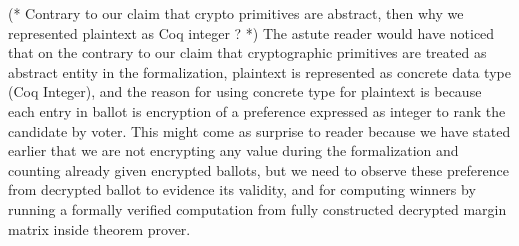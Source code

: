 \documentclass{llncs}
\begin{document}
(* Contrary to our claim that crypto primitives are abstract, then 
why we represented plaintext as Coq integer ? *)
The astute reader would have noticed that on the contrary to our claim that 
cryptographic primitives are treated as abstract entity in the 
formalization, plaintext is represented as concrete data type (Coq Integer),
 and the reason for using concrete type for plaintext is because each 
 entry in ballot is encryption of a preference expressed as integer 
 to rank the candidate by voter. 
 This might come as surprise to reader
 because we have stated earlier that we are not encrypting any value 
 during the formalization and counting already given encrypted ballots, 
 but we need to observe these preference
 from decrypted ballot to evidence its validity, 
 and  for computing winners by running a formally verified computation
 from fully constructed decrypted margin matrix inside theorem prover.

%
\end{document}
